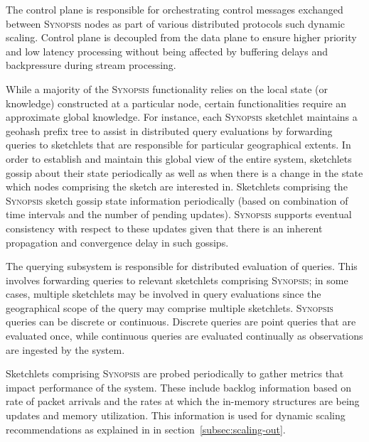 \begin{description}[leftmargin=*]
	\item[Control plane:] The control plane is responsible for orchestrating control messages exchanged between \textsc{Synopsis} nodes as part of various distributed protocols such dynamic scaling.
    Control plane is decoupled from the data plane to ensure higher priority and low latency processing without being affected by buffering delays and backpressure during stream processing.

	\item[Gossip subsystem:] While a majority of the \textsc{Synopsis} functionality relies on the local state (or knowledge) constructed at a particular node, certain functionalities require an approximate global knowledge.
    For instance, each \textsc{Synopsis} sketchlet maintains a geohash prefix tree to assist in distributed query evaluations by forwarding queries to sketchlets that are responsible for particular geographical extents.
    In order to establish and maintain this global view of the entire system, sketchlets gossip about their state periodically as well as when there is a change in the state which nodes comprising the sketch are interested in.
    Sketchlets comprising the \textsc{Synopsis} sketch gossip state information periodically (based on combination of time intervals and the number of pending updates).
    \textsc{Synopsis} supports eventual consistency with respect to these updates given that there is an inherent propagation and convergence delay in such gossips.

	\item[Querying subsystem:] The querying subsystem is responsible for distributed evaluation of queries.
    This involves forwarding queries to relevant sketchlets comprising \textsc{Synopsis}; in some cases, multiple sketchlets may be involved in query evaluations since the geographical scope of the query may comprise multiple sketchlets.
    \textsc{Synopsis} queries can be discrete or continuous.
    Discrete queries are point queries that are evaluated once, while continuous queries are evaluated continually as observations are ingested by the system.

    \item[Monitoring subsystem:] Sketchlets comprising \textsc{Synopsis} are probed periodically to gather metrics that impact performance of the system.
    These include backlog information based on rate of packet arrivals and the rates at which the in-memory structures are being updates and memory utilization.
    This information is used for dynamic scaling recommendations as explained in in section~\ref{subsec:scaling-out}.
\end{description}
